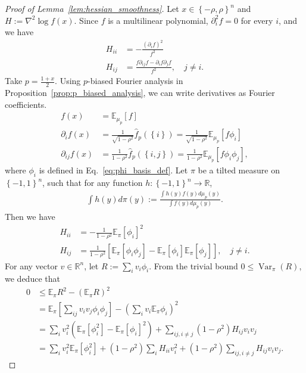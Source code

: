 \documentclass[11pt]{article}
\theoremstyle{named}
\theoremstyle{plain}
\newcommand{\defn}{:=}
\newcommand{\real}{\ensuremath{\mathbb{R}}}
\newcommand{\Exs}{\ensuremath{{\mathbb{E}}}}
\DeclareMathOperator{\Var}{Var}
\newcommand{\brackets}[1]{\left[ #1 \right]}
\newcommand{\parenth}[1]{\left( #1 \right)}
\newcommand{\braces}[1]{\left\{ #1 \right \}}
\begin{document}
\begin{proof}[Proof of Lemma~\ref{lem:hessian_smoothness}]
  Let $x \in \braces{-\rho, \rho}^n$ and $H \defn \nabla^2 \log f(x)$. Since $f$ is a multilinear polynomial, $\partial_i^2 f = 0$ for every $i$, and we have
  \begin{align*}
    H_{ii} &= - \frac{(\partial_i f)^2}{f^2} \\
    H_{ij} &= \frac{f \partial_{ij} f - \partial_i f \partial_j f}{f^2}, \quad j \neq i.
  \end{align*}
  Take $p = \frac{1+x}{2}$. Using $p$-biased Fourier analysis in Proposition~\ref{prop:p_biased_analysis}, we can write derivatives as Fourier coefficients. 
  \begin{align*}
    f (x) &= \Exs_{\mu_p}[f ] \\
  \partial_i f (x) &= \frac{1}{\sqrt{1-\rho^2}} \hat{f}_p(\braces{i}) = \frac{1}{\sqrt{1-\rho^2}} \Exs_{\mu_p}[f \phi_i] \\
  \partial_{ij} f (x) &=  \frac{1}{1-\rho^2} \hat{f}_p(\braces{i, j}) = \frac{1}{1-\rho^2} \Exs_{\mu_p}[f \phi_i \phi_j],
  \end{align*}
  where $\phi_i$ is defined in Eq.~\eqref{eq:phi_basis_def}. Let $\pi$ be a tilted measure on $\braces{-1,1}^n$, such that for any function $h: \braces{-1,1}^n \to \real$,
  \begin{align*}
    \int h(y) d\pi(y) \defn \frac{\int h(y) f(y) d\mu_p(y)}{\int f(y) d\mu_p(y)}.
  \end{align*}
  Then we have
  \begin{align*}
    H_{ii} &= - \frac{1}{1-\rho^2} \Exs_\pi[\phi_i]^2 \\
    H_{ij} &= \frac{1}{1-\rho^2} \brackets{ \Exs_\pi[\phi_i \phi_j]  - \Exs_\pi[\phi_i] \Exs_\pi[\phi_j]}, \quad j \neq i. 
  \end{align*}
  For any vector $v \in \real^n$, let $R \defn \sum_{i} v_i \phi_i$. From the trivial bound $0 \leq \Var_\pi(R)$, we deduce that
\begin{align*}
  0 &\leq \Exs_{\pi} R^2 - \parenth{\Exs_\pi R}^2 \\
  &= \Exs_{\pi} [\sum_{ij} v_i v_j \phi_i \phi_j ] - \parenth{\sum_{i} v_i \Exs_\pi \phi_i}^2 \\
  &= \sum_{i} v_i^2 (\Exs_\pi[\phi_i^2] - \Exs_\pi[\phi_i]^2) + \sum_{ij, i \neq j } (1-\rho^2) H_{ij} v_i v_j \\
  &= \sum_{i} v_i^2 \Exs_\pi[\phi_i^2] + (1-\rho^2) \sum_i H_{ii} v_i^2 + (1-\rho^2)  \sum_{ij, i \neq j } H_{ij} v_i v_j.
\end{align*}

\end{proof}
\end{document}
